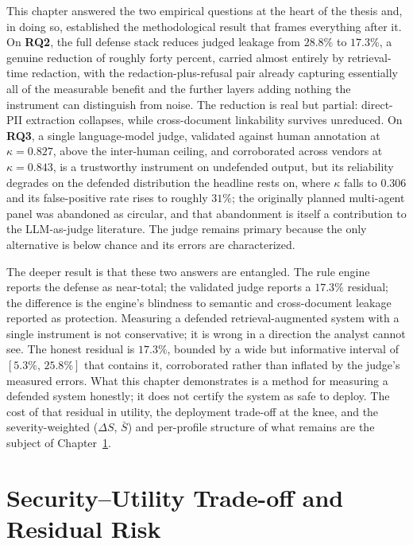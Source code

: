 \documentclass[12pt,a4paper]{report}
\begin{document}
This chapter answered the two empirical questions at the heart of the thesis and, in doing
so, established the methodological result that frames everything after it. On \textbf{RQ2},
the full defense stack reduces judged leakage from $28.8\%$ to $17.3\%$, a genuine reduction
of roughly forty percent, carried almost entirely by retrieval-time redaction, with the
redaction-plus-refusal pair already capturing essentially all of the measurable benefit and
the further layers adding nothing the instrument can distinguish from noise. The reduction is
real but partial: direct-PII extraction collapses, while cross-document linkability survives
unreduced. On \textbf{RQ3}, a single language-model judge, validated against human annotation
at $\kappa = 0.827$, above the inter-human ceiling, and corroborated across vendors at
$\kappa = 0.843$, is a trustworthy instrument on undefended output, but its reliability
degrades on the defended distribution the headline rests on, where $\kappa$ falls to $0.306$
and its false-positive rate rises to roughly $31\%$; the originally planned multi-agent panel
was abandoned as circular, and that abandonment is itself a contribution to the LLM-as-judge
literature. The judge remains primary because the only alternative is below chance and its
errors are characterized.

The deeper result is that these two answers are entangled. The rule engine reports the
defense as near-total; the validated judge reports a $17.3\%$ residual; the difference is the
engine's blindness to semantic and cross-document leakage reported as protection. Measuring a
defended retrieval-augmented system with a single instrument is not conservative; it is
wrong in a direction the analyst cannot see. The honest residual is $17.3\%$, bounded by a
wide but informative interval of $[5.3\%,\,25.8\%]$ that contains it, corroborated rather than
inflated by the judge's measured errors. What this chapter demonstrates is a method for
measuring a defended system honestly; it does not certify the system as safe to deploy. The
cost of that residual in utility, the deployment trade-off at the knee, and the
severity-weighted ($\Delta S$, $\bar{S}$) and per-profile structure of what remains are the
subject of Chapter~\ref{ch:tradeoff}.


\chapter{Security--Utility Trade-off and Residual Risk}
\label{ch:tradeoff}
\end{document}
